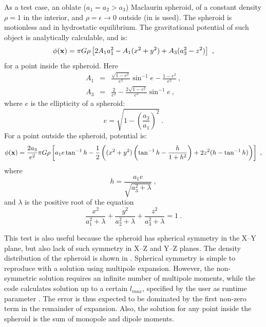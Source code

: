 As a test case, an oblate ($a_1 = a_2 > a_3$) Maclaurin spheroid, of a constant density $\rho = 1$ 
in the interior, and $\rho = \epsilon \rightarrow 0$ outside (in \flashx 
{} is used). 
The spheroid is motionless and in hydrostatic equilibrium. 
The gravitational potential of such object is analytically 
calculable, and is:
\begin{equation}
\phi({\bf x}) = \pi G \rho \left[ 2A_1 a_1^2 - A_1(x^2+y^2) + A_3(a_3^2-z^2) \right] \ ,
\end{equation}
for a point inside the spheroid. Here 
\begin{eqnarray}
A_1 &=& \frac{\sqrt{1-e^2}}{e^3} \sin^{-1}e - \frac{1-e^2}{e^2}\ , \\
A_3 &=& \frac{2}{e^2} - \frac{2\sqrt{1-e^2}}{e^3} \sin^{-1}e\ ,
\end{eqnarray}
where $e$ is the ellipticity of a spheroid:
\begin{equation}
e = \sqrt{1 - \left( \frac{a_3}{a_1} \right) ^2}\ .
\end{equation}
For a point outside the spheroid, potential is: 
\begin{equation}
\phi({\bf x}) = \frac{2a_3}{e^2} \pi G \rho \left[a_1 e \tan^{-1}h - \frac{1}{2} \left( (x^2+y^2) 
                \left( \tan^{-1}h - \frac{h}{1+h^2} \right) + 2z^2 (h-\tan^{-1}h) \right) \right]\ ,
\end{equation}
where 
\begin{equation}
h = \frac{a_1 e}{\sqrt{a_3^2 + \lambda}}\ ,
\end{equation}
and $\lambda$ is the positive root of the equation 
\begin{equation}
\frac{x^2}{a_1^2 + \lambda} + \frac{y^2}{a_2^2 + \lambda} + \frac{z^2}{a_3^2 + \lambda} = 1\ .
\end{equation}

This test is also useful because the spheroid has spherical symmetry in the X--Y plane, 
but also lack of such symmetry in X--Z and Y--Z planes.
The density distribution of the spheroid is shown in .
Spherical symmetry is simple to reproduce with a solution using multipole expansion.
However, the non-symmetric solution requires
an infinite number of multipole moments, while the code 
calculates solution up to a certain $l_{max}$, specified by the user
as runtime parameter . The error is thus expected to be dominated 
by the first non-zero term in the remainder of expansion. Also, the solution for any point inside 
the spheroid is the sum of monopole and dipole moments. 

